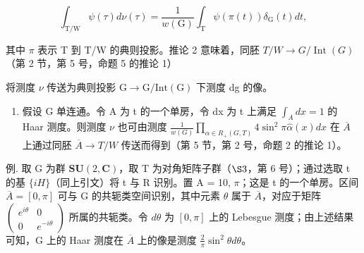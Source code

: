 \[
\int_ {\mathrm{T/W}} \psi (\tau) d \nu (\tau) = \frac {1}{w (\mathrm{G})} \int_ {\mathrm{T}} \psi (\pi (t)) \delta_ {\mathrm{G}} (t) d t,
\]

其中 \(\pi\) 表示 T 到 T/W 的典则投影。推论 2 意味着，同胚 \(T / W \to G / \operatorname{Int}(G)\)（第 2 节，第 5 号，命题 5 的推论 1）

将测度 \(\nu\) 传送为典则投影 \(\mathrm{G} \rightarrow \mathrm{G}/\mathrm{Int}(\mathrm{G})\) 下测度 dg 的像。

\begin{enumerate}
\def\labelenumi{\arabic{enumi})}
\setcounter{enumi}{2}
\tightlist
\item
  假设 G 单连通。令 A 为 t 的一个单房，令 dx 为 t 上满足 \(\int_{A} dx = 1\) 的 Haar 测度。则测度 \(\nu\) 也可由测度 \(\frac{1}{w(G)} \prod_{\alpha \in R_{+}(G,T)} 4 \sin^{2} \pi \hat{\alpha}(x) dx\) 在 \(\overline{A}\) 上通过同胚 \(\overline{A} \rightarrow T/W\) 传送而得到（第 5 节，第 2 号，命题 2 的推论 1）。
\end{enumerate}

例. 取 G 为群 \(\mathbf{SU}(2,\mathbf{C})\)，取 T 为对角矩阵子群（\(\S3\)，第 6 号）；通过选取 t 的基 \(\{iH\}\)（同上引文）将 t 与 R 识别。置 A = 10, \(\pi\)；这是 t 的一个单房。区间 \(\overline{A} = [0, \pi]\) 可与 G 的共轭类空间识别，其中元素 \(\theta\) 属于 \(\overline{A}\)，对应于矩阵 \(\begin{pmatrix} e^{i\theta} & 0 \\ 0 & e^{-i\theta} \end{pmatrix}\) 所属的共轭类。令 \(d\theta\) 为 \([0, \pi]\) 上的 Lebesgue 测度；由上述结果可知，G 上的 Haar 测度在 \(\overline{A}\) 上的像是测度 \(\frac{2}{\pi}\sin^{2}\theta d\theta\)。

